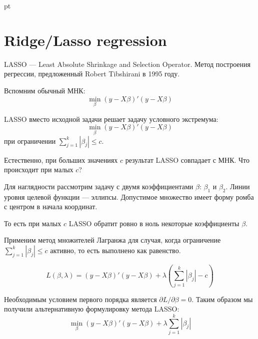 \documentclass[pdftex,12pt,a4paper]{article}
\begin{document}
 pt %

\listoftodos



\section{Ridge/Lasso regression}

LASSO --- Least Absolute Shrinkage and Selection Operator. Метод построения регрессии, предложенный Robert Tibshirani в 1995 году.

Вспомним обычный МНК:
\begin{equation}
\min_{\beta} (y-X\beta)'(y-X\beta)
\end{equation}


LASSO вместо исходной задачи решает задачу условного экстремума:
\begin{equation}
\min_{\beta} (y-X\beta)'(y-X\beta)
\end{equation}
при ограничении $\sum_{j=1}^{k}|\beta_j|\leq c$.


Естественно, при больших значениях $c$ результат LASSO совпадает с МНК. Что происходит при малых $c$?


Для наглядности рассмотрим задачу с двумя коэффициентами $\beta$: $\beta_1$ и $\beta_2$. Линии уровня целевой функции --- эллипсы. Допустимое множество имеет форму ромба с центром в начала координат.




То есть при малых $c$ LASSO обратит ровно в ноль некоторые коэффициенты $\beta$.


Применим метод множителей Лагранжа для случая, когда ограничение $\sum_{j=1}^{k}|\beta_j|\leq c$ активно, то есть выполнено как равенство. 

\begin{equation}
L(\beta,\lambda)=(y-X\beta)'(y-X\beta)+\lambda (\sum_{j=1}^{k}|\beta_j| - c )
\end{equation}

Необходимым условием первого порядка является $\partial L/\partial \beta =0$. 
Таким образом мы получили альтернативную формулировку метода LASSO:
\begin{equation}
\min_{\beta} (y-X\beta)'(y-X\beta)+\lambda \sum_{j=1}^{k}|\beta_j|
\end{equation}
\end{document}
